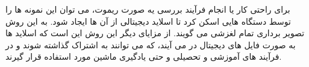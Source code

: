 برای راحتی کار یا انجام فرآیند بررسی یه صورت ریموت، می توان این نمونه ها را توسط دستگاه هایی اسکن کرد تا اسلاید دیجیتالی از آن ها ایجاد شود.
به این روش تصویر برداری تمام لغزشی می گویند.
از مزایای دیگر این روش این است که اسلاید ها به صورت فایل های دیجیتال در می آیند، که می توانند به اشتراک گذاشته شوند و در فرآیند های آموزشی و تحصیلی و حتی یادگیری ماشین مورد استفاده قرار گیرند.


\newpage

